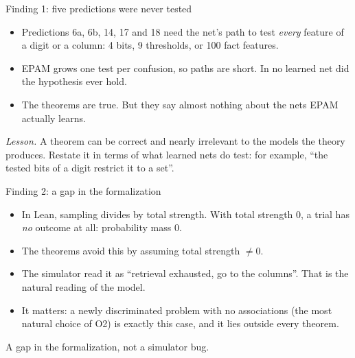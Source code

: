 \documentclass[aspectratio=169,11pt]{beamer}
\begin{document}
\begin{frame}{Finding 1: five predictions were never tested}
  \begin{itemize}
    \item Predictions 6a, 6b, 14, 17 and 18 need the net's path to test \emph{every} feature of a digit or a column: 4 bits, 9 thresholds, or 100 fact features.
    \item EPAM grows one test per confusion, so paths are short. In no learned net did the hypothesis ever hold.
    \item The theorems are true. But they say almost nothing about the nets EPAM actually learns.
  \end{itemize}
  \bigskip
  \textit{Lesson.} A theorem can be correct and nearly irrelevant to the models the theory produces. Restate it in terms of what learned nets do test: for example, ``the tested bits of a digit restrict it to a set''.
\end{frame}

\begin{frame}{Finding 2: a gap in the formalization}
  \begin{itemize}
    \item In Lean, sampling divides by total strength. With total strength 0, a trial has \emph{no} outcome at all: probability mass 0.
    \item The theorems avoid this by assuming total strength $\neq 0$.
    \item The simulator read it as ``retrieval exhausted, go to the columns''. That is the natural reading of the model.
    \item It matters: a newly discriminated problem with no associations (the most natural choice of O2) is exactly this case, and it lies outside every theorem.
  \end{itemize}
  \bigskip
  A gap in the formalization, not a simulator bug.
\end{frame}
\end{document}
